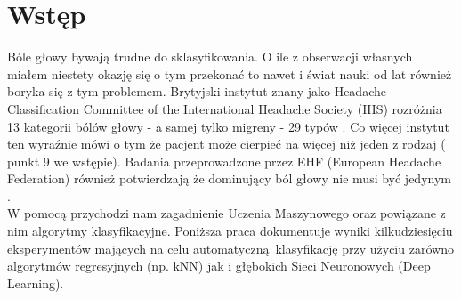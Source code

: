 \section{Wstęp}
Bóle głowy bywają trudne do sklasyfikowania. O ile z obserwacji własnych miałem niestety okazję się o tym przekonać to nawet i świat nauki od lat również boryka się z tym problemem. Brytyjski instytut znany jako Headache Classification Committee of the International Headache Society (IHS) rozróżnia 13 kategorii bólów głowy - a samej tylko migreny - 29 typów \cite{trudnosc}. Co więcej instytut ten wyraźnie mówi o tym że pacjent może cierpieć na więcej niż jeden z rodzaj (\cite{trudnosc} punkt 9 we wstępie). Badania przeprowadzone przez EHF (European Headache Federation) \cite{ehf} również potwierdzają że dominujący ból głowy nie musi być jedynym \cite{kilka}.\\

W pomocą przychodzi nam zagadnienie Uczenia Maszynowego oraz powiązane z nim algorytmy klasyfikacyjne. Poniższa praca dokumentuje wyniki kilkudziesięciu eksperymentów mających na celu automatyczną klasyfikację przy użyciu zarówno algorytmów regresyjnych (np. kNN) jak i głębokich Sieci Neuronowych (Deep Learning).